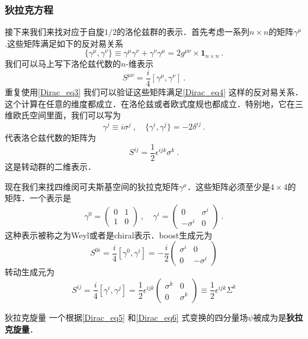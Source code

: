 \subsubsection{狄拉克方程}
接下来我们来找对应于自旋$1/2$的洛伦兹群的表示．首先考虑一系列$n\times n$的矩阵$\gamma^\mu$.这些矩阵满足如下的反对易关系
\begin{equation}\label{Dirac_eq3}
\{\gamma^\mu,\gamma^\nu\}\equiv\gamma^\mu\gamma^\nu+\gamma^\nu\gamma^\mu = 2 g^{\mu\nu} \times \boldsymbol{1}_{n\times n}~.
\end{equation}
我们可以马上写下洛伦兹代数的$n$-维表示
\begin{equation}
S^{\mu\nu} = \frac{i}{4}[\gamma^\mu,\gamma^\nu]~.
\end{equation}
重复使用\autoref{Dirac_eq3} 我们可以验证这些矩阵满足\autoref{Dirac_eq4} 这样的反对易关系．这个计算在任意的维度都成立．在洛伦兹或者欧式度规也都成立．特别地，它在三维欧氏空间里面，我们可以写为
\begin{equation}
\gamma^j \equiv i \sigma^j~,\quad \{\gamma^i,\gamma^j\} = - 2 \delta^{ij} ~.
\end{equation}
代表洛仑兹代数的矩阵为
\begin{equation}
S^{ij} = \frac{1}{2} \epsilon^{ijk} \sigma^k~.
\end{equation}
这是转动群的二维表示．

现在我们来找四维闵可夫斯基空间的狄拉克矩阵$\gamma^\mu$．这些矩阵必须至少是$4\times 4$的矩阵．一个表示是
\begin{equation}
\gamma^0 = \begin{pmatrix}
0 & 1 \\ 1 & 0
\end{pmatrix}~,\quad \gamma^i = \begin{pmatrix}
0 & \sigma^i \\
-\sigma^i & 0 
\end{pmatrix}~.
\end{equation}
这种表示被称之为Weyl或者是chiral表示．boost生成元为
\begin{equation}\label{Dirac_eq5}
S^{0i} = \frac{i}{4}[\gamma^0,\gamma^i]=-\frac{i}{2}\begin{pmatrix}
\sigma^i & 0 \\
0 & -\sigma^i 
\end{pmatrix}
\end{equation}
转动生成元为
\begin{equation}\label{Dirac_eq6}
S^{ij} = \frac{i}{4}[\gamma^i,\gamma^j] = \frac{1}{2} \epsilon^{ijk} \begin{pmatrix}
\sigma^k & 0 \\ 
0 & \sigma^k 
\end{pmatrix}\equiv \frac{1}{2} \epsilon^{ijk} \Sigma^k
\end{equation}
\begin{definition}{狄拉克旋量}
一个根据\autoref{Dirac_eq5} 和\autoref{Dirac_eq6} 
式变换的四分量场$\psi$被成为是\textbf{狄拉克旋量}．
\end{definition}




